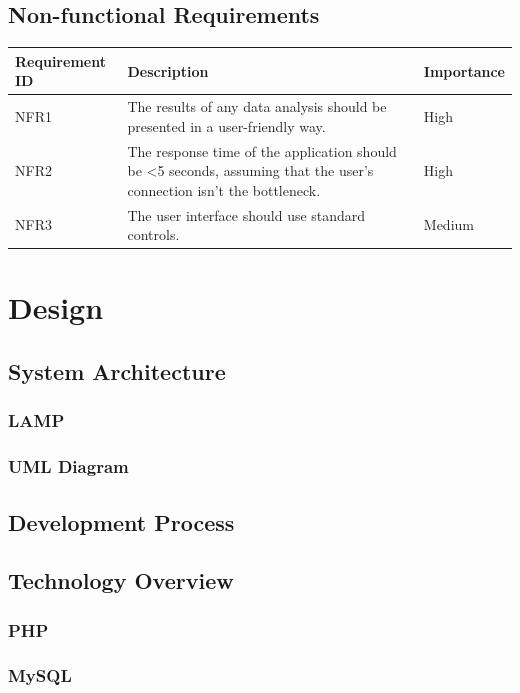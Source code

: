 \documentclass[authoryearcitations]{UoYCSproject}
\begin{document}
\section{Non-functional Requirements}

\begin{tabular}{| p{2.2cm} | p{7.5cm} | p{2cm} |}
	\hline
	\textbf{Requirement ID} & \textbf{Description} & \textbf{Importance} \\ \hline
	NFR1 & The results of any data analysis should be presented in a user-friendly way. & High \\ \hline
	NFR2 & The response time of the application should be <5 seconds, assuming that the user's connection isn't the bottleneck. & High \\ \hline
	NFR3 & The user interface should use standard controls. & Medium \\
	\hline
\end{tabular}


\chapter{Design}

\section{System Architecture}

\subsection{LAMP}

\subsection{UML Diagram}

\section{Development Process}

\section{Technology Overview}

\subsection{PHP}

\subsection{MySQL}
\end{document}
